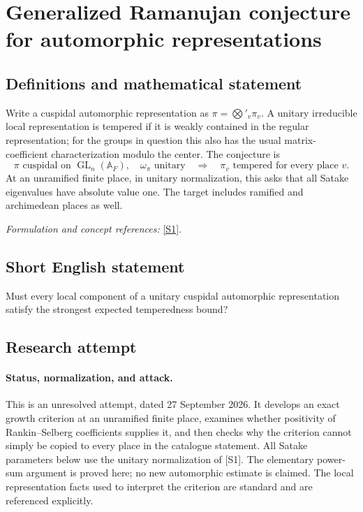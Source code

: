 \documentclass[11pt]{article}
\begin{document}
\section*{\texorpdfstring{Generalized Ramanujan conjecture for automorphic representations}{Generalized Ramanujan conjecture for automorphic representations}}\label{9400078}
\subsection{Definitions and mathematical statement}
Write a cuspidal automorphic representation as $\pi=\bigotimes'_v\pi_v$. A unitary irreducible local representation is tempered if it is weakly contained in the regular representation; for the groups in question this also has the usual matrix-coefficient characterization modulo the center. The conjecture is
\[
 \pi\text{ cuspidal on }\operatorname{GL}_n({\mathbb{A}}_F),\quad
 \omega_\pi\text{ unitary}\quad\Longrightarrow\quad
 \pi_v\text{ tempered for every place }v.
\]
At an unramified finite place, in unitary normalization, this asks that all Satake eigenvalues have absolute value one. The target includes ramified and archimedean places as well.
\par\smallskip\textit{Formulation and concept references:} \href{https://web.math.princeton.edu/~sarnak/Preprints/SarnakFieldsNotes.pdf}{[S1]}.

\subsection{Short English statement}
Must every local component of a unitary cuspidal automorphic representation satisfy the strongest expected temperedness bound?
\subsection{Research attempt}
\paragraph{Status, normalization, and attack.}
This is an unresolved attempt, dated 27 September 2026. It develops an exact
growth criterion at an unramified finite place, examines whether positivity
of Rankin--Selberg coefficients supplies it, and then checks why the criterion
cannot simply be copied to every place in the catalogue statement.
All Satake parameters below use the unitary normalization of [S1]. The
elementary power-sum argument is proved here; no new automorphic estimate
is claimed. The local representation facts used to interpret the criterion
are standard and are referenced explicitly.
\end{document}
